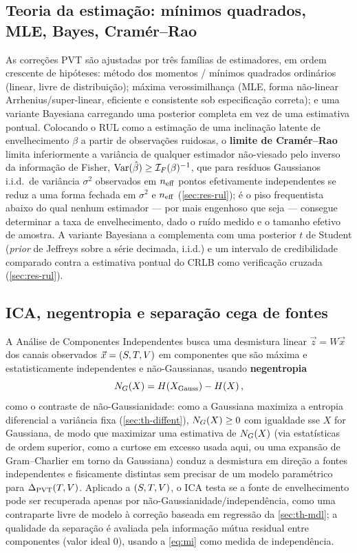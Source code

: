 \subsection{Teoria da estimação: mínimos quadrados, MLE, Bayes, Cram\'er--Rao}
\label{sec:th-estimation}
As correções PVT são ajustadas por três famílias de estimadores, em ordem
crescente de hipóteses: método dos momentos / mínimos quadrados ordinários
(linear, livre de distribuição); máxima verossimilhança (MLE, forma
não-linear Arrhenius/super-linear, eficiente e consistente sob especificação
correta); e uma variante Bayesiana carregando uma posterior completa em vez
de uma estimativa pontual. Colocando o RUL como a estimação de uma
inclinação latente de envelhecimento $\beta$ a partir de observações
ruidosas, o \textbf{limite de Cram\'er--Rao} limita inferiormente a
variância de qualquer estimador não-viesado pelo inverso da informação de
Fisher, $\mathrm{Var}(\hat\beta)\ge \mathcal{I}_F(\beta)^{-1}$, que para resíduos
Gaussianos i.i.d.\ de variância $\sigma^2$ observados em $n_{\mathrm{eff}}$ pontos
efetivamente independentes se reduz a uma forma fechada em $\sigma^2$ e
$n_{\mathrm{eff}}$ (\cref{sec:res-rul}); é o piso frequentista abaixo do qual nenhum
estimador --- por mais engenhoso que seja --- consegue determinar a taxa de
envelhecimento, dado o ruído medido e o tamanho efetivo de amostra. A
variante Bayesiana a complementa com uma posterior $t$ de Student (\emph{prior}
de Jeffreys sobre a série decimada, i.i.d.) e um intervalo de credibilidade
comparado contra a estimativa pontual do CRLB como verificação cruzada
(\cref{sec:res-rul}).

\subsection{ICA, negentropia e separação cega de fontes}
\label{sec:th-ica}
A Análise de Componentes Independentes \cite{hyvarinen2001} busca uma
desmistura linear $\vec z = W\vec x$ dos canais observados
$\vec x=(S,T,V)$ em componentes que são máxima e
estatisticamente independentes e não-Gaussianas, usando \textbf{negentropia}
\begin{equation}
  N_G\!\left(X\right) = H\!\left(X_{\text{Gauss}}\right) - H\!\left(X\right),
  \label{eq:negentropy}
\end{equation}
como o contraste de não-Gaussianidade: como a Gaussiana maximiza a entropia
diferencial a variância fixa (\cref{sec:th-diffent}), $N_G\!\left(X\right)\ge0$ com
igualdade sse $X$ for Gaussiana, de modo que maximizar uma estimativa de
$N_G\!\left(X\right)$ (via estatísticas de ordem superior, como a curtose em excesso
usada aqui, ou uma expansão de Gram--Charlier em torno da Gaussiana) conduz a
desmistura em direção a fontes independentes e fisicamente distintas sem
precisar de um modelo paramétrico para $\Delta_{\mathrm{PVT}}(T,V)$. Aplicado a
$(S,T,V)$, o ICA testa se a fonte de envelhecimento pode ser
recuperada apenas por não-Gaussianidade/independência, como uma contraparte
livre de modelo à correção baseada em regressão da \cref{sec:th-mdl}; a
qualidade da separação é avaliada pela informação mútua residual entre
componentes (valor ideal $0$), usando a \cref{eq:mi} como medida de
independência.

